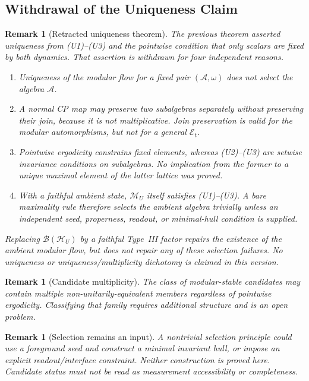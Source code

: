 \documentclass[12pt,a4paper]{article}
\newtheorem{remark}[theorem]{Remark}
\begin{document}
\subsection{Withdrawal of the Uniqueness Claim}
\label{sec:modular-uniqueness}

\begin{remark}[Retracted uniqueness theorem]
\label{thm:uniqueness}
The previous theorem asserted uniqueness from (U1)--(U3) and the pointwise condition that only scalars are fixed by both dynamics.  That assertion is withdrawn for four independent reasons.
\begin{enumerate}
\item Uniqueness of the modular flow for a \emph{fixed pair} $(\mathcal A,\omega)$ does not select the algebra $\mathcal A$.
\item A normal CP map may preserve two subalgebras separately without preserving their join, because it is not multiplicative.  Join preservation is valid for the modular automorphisms, but not for a general $\mathcal E_t$.
\item Pointwise ergodicity constrains fixed elements, whereas (U2)--(U3) are setwise invariance conditions on subalgebras.  No implication from the former to a unique maximal element of the latter lattice was proved.
\item With a faithful ambient state, $\mathcal M_U$ itself satisfies (U1)--(U3).  A bare maximality rule therefore selects the ambient algebra trivially unless an independent seed, properness, readout, or minimal-hull condition is supplied.
\end{enumerate}
Replacing $\mathcal B(\mathcal H_U)$ by a faithful Type~III factor repairs the existence of the ambient modular flow, but does not repair any of these selection failures.  No uniqueness or uniqueness/multiplicity dichotomy is claimed in this version.
\end{remark}

\begin{remark}[Candidate multiplicity]
\label{rem:ergodicity}
The class of modular-stable candidates may contain multiple non-unitarily-equivalent members regardless of pointwise ergodicity.  Classifying that family requires additional structure and is an open problem.
\end{remark}

\begin{remark}[Selection remains an input]
A nontrivial selection principle could use a foreground seed and construct a minimal invariant hull, or impose an explicit readout/interface constraint.  Neither construction is proved here.  Candidate status must not be read as measurement accessibility or completeness.
\end{remark}
\end{document}

